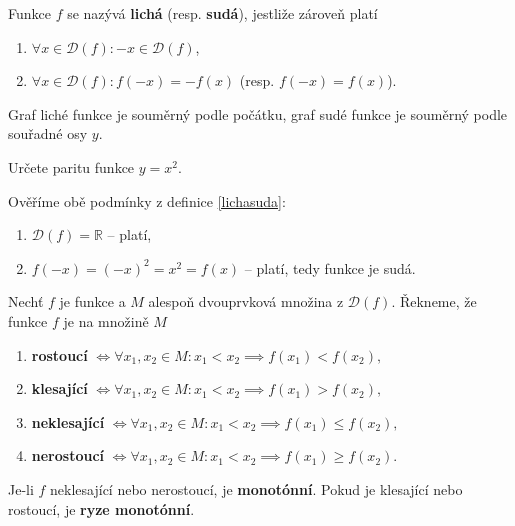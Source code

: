\begin{definition}\label{lichasuda}
  Funkce $f$ se nazývá \textbf{lichá} (resp. \textbf{sudá}), jestliže zároveň platí
  \begin{enumerate}[$i.$]
    \item $\forall x \in \mathcal D(f)\colon -x \in \mathcal D(f)$,
  	\item $\forall x \in \mathcal D(f)\colon f(-x)=-f(x)$ (resp. $f(-x)=f(x)$).
  \end{enumerate}
\end{definition}

\begin{pozn}
  Graf liché funkce je souměrný podle počátku, graf sudé funkce je souměrný podle souřadné osy $y$.
\end{pozn}

\begin{priklad}
Určete paritu funkce $y=x^2$.
\end{priklad}

\begin{reseni}
Ověříme obě podmínky z definice \ref{lichasuda}:
\begin{enumerate}[$i.$]
\item $\mathcal D(f)=\mathbb R$ -- platí,
\item $f(-x)=(-x)^2=x^2=f(x)$ -- platí, tedy funkce je sudá.
\end{enumerate}
\end{reseni}

\begin{definition}
  Nechť $f$ je funkce a $M$ alespoň dvouprvková množina z $\mathcal D(f)$. Řekneme, že funkce $f$ je na množině $M$
  \begin{enumerate}[$i.$]
    \item \textbf{rostoucí} $\iff \forall x_1, x_2 \in M\colon x_1 < x_2 \implies f(x_1) < f(x_2),$
    \item \textbf{klesající} $\iff \forall x_1, x_2 \in M\colon x_1 < x_2 \implies f(x_1) > f(x_2),$
    \item \textbf{neklesající} $\iff \forall x_1, x_2 \in M\colon x_1 < x_2 \implies f(x_1) \leq f(x_2),$
    \item \textbf{nerostoucí} $\iff \forall x_1, x_2 \in M\colon x_1 < x_2 \implies f(x_1) \geq f(x_2).$
  \end{enumerate}
  Je-li $f$ neklesající nebo nerostoucí, je \textbf{monotónní}. Pokud je klesající nebo rostoucí, je \textbf{ryze monotónní}.
\end{definition}

